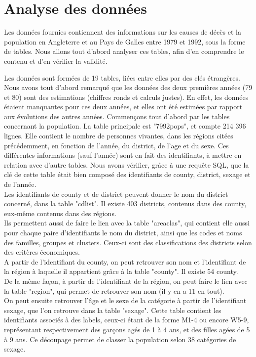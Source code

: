 \chapter{Analyse des données}

 Les données fournies contiennent des informations sur les causes de décès et la population en Angleterre et au Pays de Galles entre 1979 et 1992, sous la forme de tables. Nous allons tout d'abord analyser ces tables, afin d'en comprendre le contenu et d'en vérifier la validité. \\

\begin{paragraph}
Les données sont formées de 19 tables, liées entre elles par des clés étrangères. Nous avons tout d'abord remarqué que les données des deux premières années (79 et 80) sont des estimations (chiffres ronds et calculs justes). En effet, les données étaient manquantes pour ces deux années, et elles ont été estimées par rapport aux évolutions des autres années. Commençons tout d'abord par les tables concernant la population. La table principale est "7992pops", et compte 214 396 lignes. Elle contient le nombre de personnes vivantes, dans les régions citées précédemment, en fonction de l'année, du district, de l'age et du sexe. Ces différentes informations (sauf l'année) sont en fait des identifiants, à mettre en relation avec d'autre tables. Nous avons vérifier, grâce à une requête SQL, que la clé de cette table était bien composé des identifiants de county, district, sexage et de l'année.\\
Les identifiants de county et de district peuvent donner le nom du district concerné, dans la table "cdlist". Il existe 403 districts, contenus dans des county, eux-même contenus dans des régions. \\
Ils permettent aussi de faire le lien avec la table "areaclas", qui contient elle aussi pour chaque paire d'identifiants le nom du district, ainsi que les codes et noms des familles, groupes et clusters. Ceux-ci sont des classifications des districts selon des critères économiques. \\
A partir de l'identifiant du county, on peut retrouver son nom et l'identifiant de la région à laquelle il appartient grâce à la table "county". Il existe 54 county.\\
De la même façon, à partir de l'identifiant de la région, on peut faire le lien avec la table "region", qui permet de retrouver son nom (il y en a 11 en tout). \\
On peut ensuite retrouver l'âge et le sexe de la catégorie à partir de l'identifiant sexage, que l'on retrouve dans la table "sexage". Cette table contient les identifiants associés à des labels, ceux-ci étant de la forme M1-4 ou encore W5-9, représentant respectivement des garçons agés de 1 à 4 ans, et des filles agées de 5 à 9 ans. Ce découpage permet de classer la population selon 38 catégories de sexage.\\
\end{paragraph}

